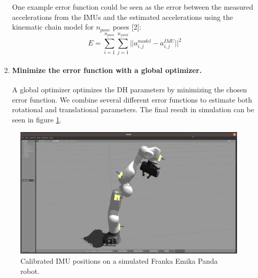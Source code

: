 \begin{enumerate}
    One example error function could be seen as the error between the measured accelerations from the IMUs and the estimated accelerations using the kinematic chain model for $n_{pose}$ poses [2]:
    $$E = \sum_{i=1}^{n_{pose}} \sum_{j=1}^{n_{joint}} ||a^{model}_{i,j} - a^{IMU}_{i,j}||^2$$

    \item \paragraph{Minimize the error function with a global optimizer.}
    A global optimizer optimizes the DH parameters by minimizing the chosen error function. We combine several different error functions to estimate both rotational and translational parameters. The final result in simulation can be seen in figure \ref{fig:calibration_result}.

\end{enumerate}

\begin{figure}[htbp]
    \caption[Calibration result]{
    Calibrated IMU positions on a simulated Franka Emika Panda robot.
    }
    \begin{center}
    \includegraphics[width=140mm]{figs/calibration_result.png}
    \end{center}
\label{fig:calibration_result}
\end{figure}
